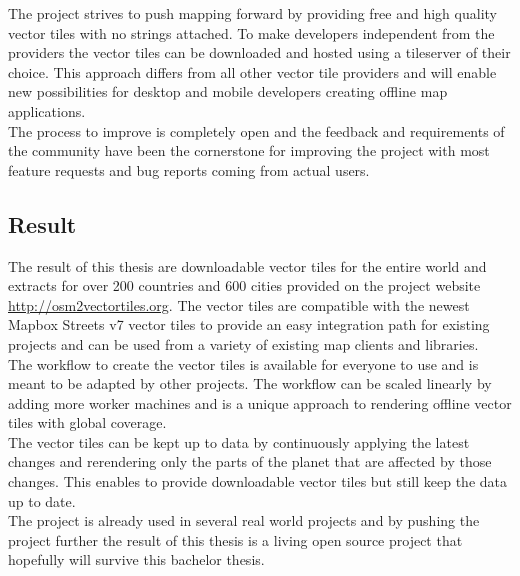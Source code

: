 The \osmvt{} project strives to push mapping forward by providing free and high quality vector tiles with no strings attached. To make developers independent from the providers
the vector tiles can be downloaded and hosted using a tileserver of their choice. This approach differs from all other vector tile providers and will enable new possibilities for desktop and mobile developers creating offline map applications.\\

The process to improve \osmvt{} is completely open and the feedback and requirements of the
community have been the cornerstone for improving the project with most feature requests and
bug reports coming from actual users.

\subsection*{Result}

The result of this thesis are downloadable vector tiles for the entire world and extracts for over 200 countries and 600 cities provided on the project website \url{http://osm2vectortiles.org}. The vector tiles are compatible with the newest Mapbox Streets v7 vector tiles to provide an easy integration path for existing projects and can be used from a variety of existing map clients and libraries.\\

The workflow to create the vector tiles is available for everyone to use and is meant to be adapted by other projects. The workflow can be scaled linearly by adding more worker machines and is a unique approach to rendering offline vector tiles with global coverage.\\

The vector tiles can be kept up to data by continuously applying the latest \osm{} changes and rerendering only the parts of the planet that are affected by those changes. This enables to provide downloadable vector tiles but still keep the data up to date.\\

The \osmvt{} project is already used in several real world projects and by pushing the project further the result of this thesis is a living open source project that hopefully will survive this bachelor thesis.
    
